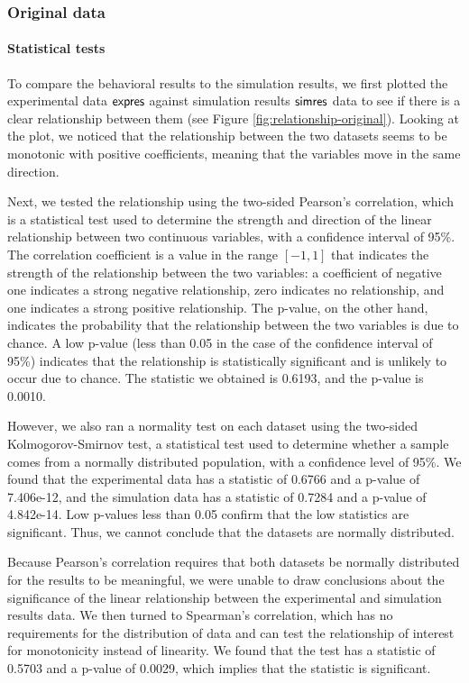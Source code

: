 \subsubsection{Original data}

\paragraph{Statistical tests}

To compare the behavioral results to the simulation results, we first plotted the experimental data $\mathsf{expres}$ against simulation results $\mathsf{simres}$ data to see if there is a clear relationship between them (see Figure \ref{fig:relationship-original}). Looking at the plot, we noticed that the relationship between the two datasets seems to be monotonic with positive coefficients, meaning that the variables move in the same direction.

Next, we tested the relationship using the two-sided Pearson's correlation, which is a statistical test used to determine the strength and direction of the linear relationship between two continuous variables, with a confidence interval of 95\%. The correlation coefficient is a value in the range $[-1, 1]$ that indicates the strength of the relationship between the two variables: a coefficient of negative one indicates a strong negative relationship, zero indicates no relationship, and one indicates a strong positive relationship. The p-value, on the other hand, indicates the probability that the relationship between the two variables is due to chance. A low p-value (less than 0.05 in the case of the confidence interval of 95\%) indicates that the relationship is statistically significant and is unlikely to occur due to chance.
The statistic we obtained is 0.6193, and the p-value is 0.0010.

However, we also ran a normality test on each dataset using the two-sided Kolmogorov-Smirnov test, a statistical test used to determine whether a sample comes from a normally distributed population, with a confidence level of 95\%. We found that the experimental data has a statistic of 0.6766 and a p-value of 7.406e-12, and the simulation data has a statistic of 0.7284 and a p-value of 4.842e-14. Low p-values less than 0.05 confirm that the low statistics are significant. Thus, we cannot conclude that the datasets are normally distributed.

Because Pearson's correlation requires that both datasets be normally distributed for the results to be meaningful, we were unable to draw conclusions about the significance of the linear relationship between the experimental and simulation results data. We then turned to Spearman's correlation, which has no requirements for the distribution of data and can test the relationship of interest for monotonicity instead of linearity. 
We found that the test has a statistic of 0.5703 and a p-value of 0.0029, which implies that the statistic is significant.

